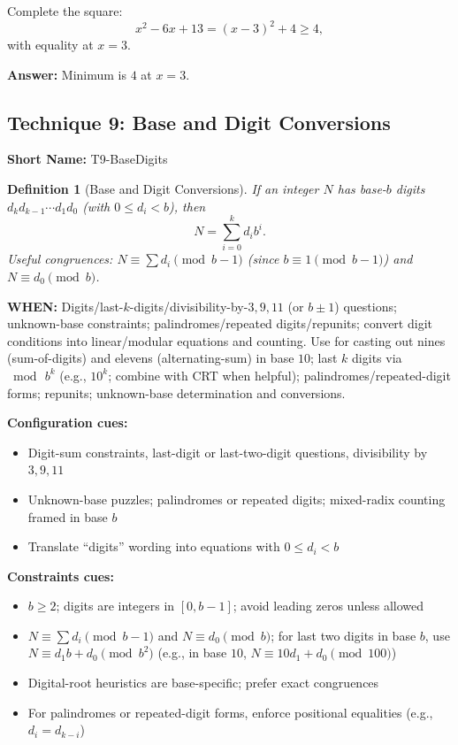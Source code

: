 \documentclass[12pt]{article}
\newtheorem{definition}{Definition}[section]
\newenvironment{solution}
{\begin{tcolorbox}[colback=green!5!white,colframe=green!75!black,title={Solution}]}{\end{tcolorbox}}
\begin{document}
\begin{solution}
Complete the square:
\[
 x^2 - 6x + 13 = (x - 3)^2 + 4 \ge 4,
\]
with equality at $x = 3$.

\textbf{Answer:} Minimum is $4$ at $x = 3$.
\end{solution}

\subsection{Technique 9: Base and Digit Conversions}
\textbf{Short Name:} T9-BaseDigits

\begin{definition}[Base and Digit Conversions]
If an integer $N$ has base-$b$ digits \\
$d_k d_{k-1}\cdots d_1 d_0$ (with $0 \le d_i < b$), then
\[
N = \sum_{i=0}^{k} d_i b^i.
\]
Useful congruences: $N \equiv \sum d_i \pmod{b-1}$ (since $b \equiv 1 \pmod{b-1}$) and $N \equiv d_0 \pmod{b}$.
\end{definition}

\textbf{WHEN:} Digits/last-$k$-digits/divisibility-by-$3,9,11$ (or $b\pm1$) questions; unknown-base constraints; palindromes/repeated digits/repunits; convert digit conditions into linear/modular equations and counting. Use for casting out nines (sum-of-digits) and elevens (alternating-sum) in base $10$; last $k$ digits via $\bmod\,b^k$ (e.g., $10^k$; combine with CRT when helpful); palindromes/repeated-digit forms; repunits; unknown-base determination and conversions.

\textbf{Configuration cues:}
\begin{itemize}
    \item Digit-sum constraints, last-digit or last-two-digit questions, divisibility by $3,9,11$
    \item Unknown-base puzzles; palindromes or repeated digits; mixed-radix counting framed in base $b$
    \item Translate ``digits'' wording into equations with $0 \le d_i < b$
\end{itemize}

\textbf{Constraints cues:}
\begin{itemize}
    \item $b \ge 2$; digits are integers in $[0,b-1]$; avoid leading zeros unless allowed
    \item $N \equiv \sum d_i \pmod{b-1}$ and $N \equiv d_0 \pmod{b}$; for last two digits in base $b$, use $N \equiv d_1 b + d_0 \pmod{b^2}$ (e.g., in base $10$, $N \equiv 10d_1 + d_0 \pmod{100}$)
    \item Digital-root heuristics are base-specific; prefer exact congruences
    \item For palindromes or repeated-digit forms, enforce positional equalities (e.g., $d_i=d_{k-i}$)
\end{itemize}
\end{document}
